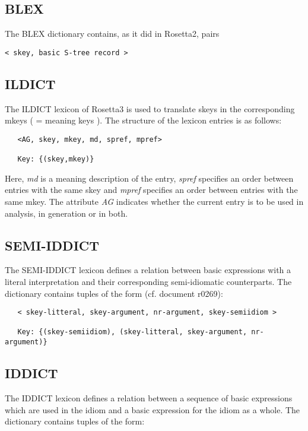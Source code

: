 \subsection {BLEX}
The BLEX dictionary contains, as it did in Rosetta2, pairs 
\begin{verbatim}
< skey, basic S-tree record >
\end{verbatim}

\subsection {ILDICT}
The ILDICT lexicon of Rosetta3 is used to translate skeys in the 
corresponding mkeys ( = meaning keys ). The structure of the lexicon
entries is as follows:

\begin{verbatim}
   <AG, skey, mkey, md, spref, mpref>

   Key: {(skey,mkey)}

\end{verbatim}
Here, {\em md} is a meaning description of the entry, {\em spref} specifies 
an order between entries 
with the same skey and {\em mpref} specifies an order between entries with the
same mkey. The attribute {\em AG} indicates whether the current entry is to be
used in analysis, in generation or in both.

\subsection{SEMI-IDDICT}

The SEMI-IDDICT lexicon defines a relation between basic expressions with a 
literal interpretation and their corresponding semi-idiomatic counterparts. The
dictionary contains tuples of the form (cf. document r0269):

\begin{verbatim}
   < skey-litteral, skey-argument, nr-argument, skey-semiidiom >

   Key: {(skey-semiidiom), (skey-litteral, skey-argument, nr-argument)}

\end{verbatim}

\subsection{IDDICT}

The IDDICT lexicon defines a relation between a sequence of basic 
expressions which are used in the idiom and a basic expression for the
idiom as a whole. The
dictionary contains tuples of the form:

